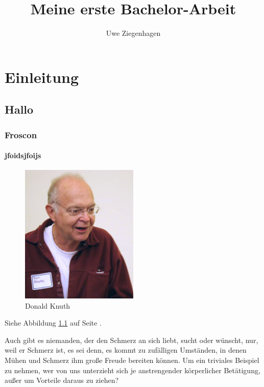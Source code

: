 \documentclass[12pt]{scrreprt}
\author{Uwe Ziegenhagen}
\title{Meine erste Bachelor-Arbeit}
\begin{document}
\maketitle

\tableofcontents

\listoffigures

\listoftables

\chapter{Einleitung}

\section{Hallo}

\subsection{Froscon}

\subsubsection{jfoidsjfoijs}

\begin{figure}[h]
\begin{center}
\includegraphics[width=0.5\textwidth]{KnuthAtOpenContentAlliance}
\caption{Donald Knuth}\label{fig:don}
\end{center}
\end{figure}

Siehe Abbildung \ref{fig:don} auf Seite \pageref{fig:don}.

Auch gibt es niemanden, der den Schmerz an sich liebt, sucht oder wünscht, nur, weil er Schmerz ist, es sei denn, es kommt zu zufälligen Umständen, in denen Mühen und Schmerz ihm große Freude bereiten können. Um ein triviales Beispiel zu nehmen, wer von uns unterzieht sich je anstrengender körperlicher Betätigung, außer um Vorteile daraus zu ziehen?
\end{document}
